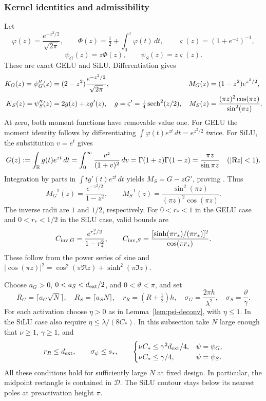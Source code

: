 \subsubsection{Kernel identities and admissibility}
Let
\[
 \varphi(z)=\frac{e^{-z^2/2}}{\sqrt{2\pi}},\qquad
 \Phi(z)=\tfrac12+\int_0^z\varphi(t)\,dt,
 \qquad \varsigma(z)=(1+e^{-z})^{-1},
\]
\[
 \psi_G(z)=z\Phi(z),\qquad \psi_S(z)=z\varsigma(z).
\]
These are exact GELU and SiLU. Differentiation gives
\begin{align}
 K_G(z)=\psi_G''(z)&=(2-z^2)\frac{e^{-z^2/2}}{\sqrt{2\pi}},
 &M_G(z)&=(1-z^2)e^{z^2/2}, \label{eq:gelu-kernel}\\
 K_S(z)=\psi_S''(z)&=2g(z)+zg'(z),\quad g=\varsigma'=\tfrac14\operatorname{sech}^2(z/2),
 &M_S(z)&=\frac{(\pi z)^2\cos(\pi z)}{\sin^2(\pi z)}.
 \label{eq:silu-kernel}
\end{align}
At zero, both moment functions have removable value one. For GELU the moment
identity follows by differentiating $\int\varphi(t)e^{zt}\,dt=e^{z^2/2}$
twice. For SiLU, the substitution $v=e^t$ gives
\[
 G(z):=\int_\mathbb R g(t)e^{zt}\,dt
 =\int_0^\infty\frac{v^z}{(1+v)^2}\,dv
 =\Gamma(1+z)\Gamma(1-z)=\frac{\pi z}{\sin\pi z}
 \quad(|\Re z|<1).
\]
Integration by parts in $\int t g'(t)e^{zt}\,dt$ yields
$M_S=G-zG'$, proving .
Thus
\begin{equation}
 M_G^{-1}(z)=\frac{e^{-z^2/2}}{1-z^2},\qquad
 M_S^{-1}(z)=\frac{\sin^2(\pi z)}{(\pi z)^2\cos(\pi z)}.
 \label{eq:psi-inverse-symbols}
\end{equation}
The inverse radii are $1$ and $1/2$, respectively. For $0<r_*<1$ in the
GELU case and $0<r_*<1/2$ in the SiLU case, valid bounds are
\begin{equation}
 C_{{\rm inv},G}=\frac{e^{r_*^2/2}}{1-r_*^2},\qquad
 C_{{\rm inv},S}=\frac{[\sinh(\pi r_*)/(\pi r_*)]^2}{\cos(\pi r_*)}.
 \label{eq:psi-inverse-bounds}
\end{equation}
These follow from the power series of sine and
$|\cos(\pi z)|^2=\cos^2(\pi\Re z)+\sinh^2(\pi\Im z)$.

Choose $a_G>0$, $0<a_S<d_{\rm ext}/2$, and $0<\vartheta<\pi$, and set
\begin{equation}
 R_G=\lceil a_G\sqrt N\rceil,\quad R_S=\lceil a_SN\rceil,
 \quad r_R=(R+\tfrac12)h,\quad
 \sigma_G=\frac{2\pi h}{\lambda^2},\quad \sigma_S=\frac\vartheta\gamma.
 \label{eq:psi-geometry}
\end{equation}
For each activation choose $\eta>0$ as in Lemma~\ref{lem:psi-deconv}, with
$\eta\le1$. In the SiLU case also require $\eta\le\lambda/(8C_*)$.
In this subsection take $N$ large enough that $\nu\ge1$, $\gamma\ge1$, and
\begin{equation}
 r_R\le d_{\rm ext},\qquad \sigma_\psi\le s_*,\qquad
 \begin{cases}
 \nu C_*\le\gamma^2d_{\rm ext}/4,&\psi=\psi_G,\\
 \nu C_*\le\gamma/4,&\psi=\psi_S.
 \end{cases}
 \label{eq:psi-admissible}
\end{equation}
All these conditions hold for sufficiently large $N$ at fixed design. In
particular, the midpoint rectangle is contained in $\mathcal D$. The SiLU
contour stays below its nearest poles at preactivation height $\pi$.

